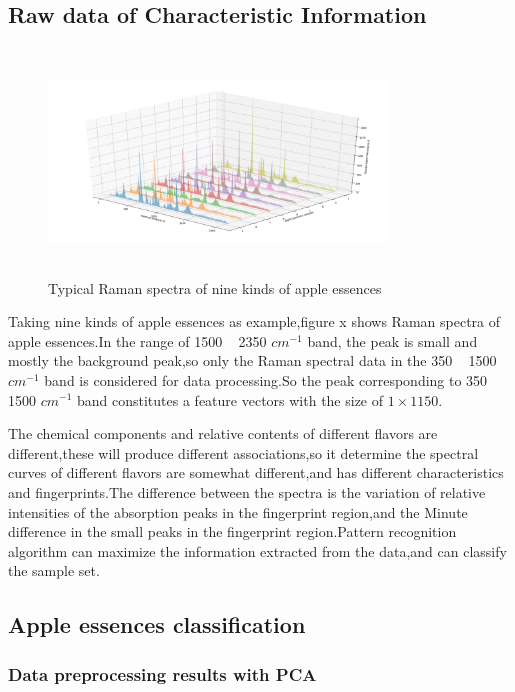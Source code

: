 \documentclass[a4paper]{article}
\begin{document}
\subsection{Raw data of Characteristic Information}
\begin{figure}[h]
  \centering
  \includegraphics[width=9cm,height=6cm]{Typical_Raman_spectra}
  \caption{Typical Raman spectra of nine kinds of apple essences}
\end{figure}
Taking nine kinds of apple essences as example,figure x shows Raman spectra of apple essences.In the range of 1500 ~ 2350 $cm^{-1}$ band, the peak is small and mostly the background peak,so only the Raman spectral data in the 350 ~ 1500 $cm^{-1}$ band is considered for data processing.So the peak corresponding to 350 ~ 1500 $cm^{-1}$ band constitutes a feature vectors with the size of $ 1\times 1150 $.

The chemical components and relative contents of different flavors are different,these will produce different associations,so it  determine the spectral curves of different flavors are somewhat different,and has different  characteristics and fingerprints.The difference between the spectra is the variation of relative intensities of the absorption peaks in the fingerprint region,and the Minute difference in the small peaks in the fingerprint region.Pattern recognition algorithm can maximize the information extracted from the data,and can classify the sample set.


\subsection{Apple essences classification}
    \subsubsection{Data preprocessing results with PCA}
\end{document}
